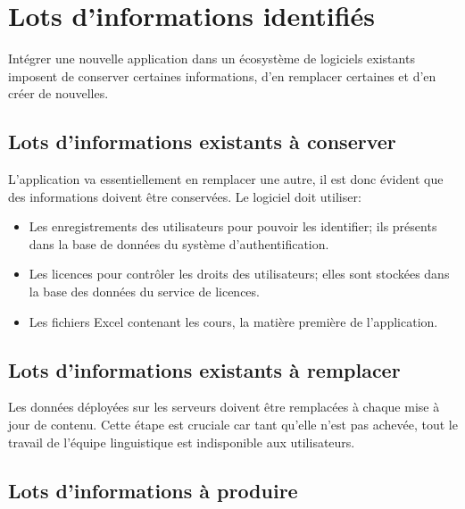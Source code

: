 \section{Lots d'informations identifiés}
\label{sec:identified-information-packages}
    Intégrer une nouvelle application dans un écosystème de logiciels existants imposent de conserver certaines informations, d'en remplacer certaines et d'en créer de nouvelles.

\subsection{Lots d’informations existants à conserver}
\label{ssec:existing-information-packages-to-keep}
    L'application va essentiellement en remplacer une autre, il est donc évident que des informations doivent être conservées.
    Le logiciel doit utiliser:
    \begin{itemize}
        \item Les enregistrements des utilisateurs pour pouvoir les identifier; ils présents dans la base de données du système d'authentification.
        \item Les licences pour contrôler les droits des utilisateurs; elles sont stockées dans la base des données du service de licences.
        \item Les fichiers Excel contenant les cours, la matière première de l'application\fnmark.
    \end{itemize}
    

\subsection{Lots d’informations existants à remplacer}
\label{ssec:existing-information-packages-to-replace}

    Les données déployées sur les serveurs doivent être remplacées à chaque mise à jour de contenu.
    Cette étape est cruciale car tant qu'elle n'est pas achevée, tout le travail de l'équipe linguistique est indisponible aux utilisateurs.

\subsection{Lots d’informations à produire}
\label{ssec:information-packages-to-produce}

